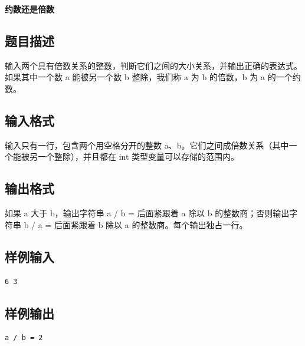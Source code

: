 \documentclass{article}
\newcommand{\problemname}[1]{\begin{center}\Large\bfseries #1\end{center}}
\begin{document}
\problemname{约数还是倍数}

\subsection*{题目描述}
输入两个具有倍数关系的整数，判断它们之间的大小关系，并输出正确的表达式。如果其中一个数 a 能被另一个数 b 整除，我们称 a 为 b 的倍数，b 为 a 的一个约数。

\subsection*{输入格式}
输入只有一行，包含两个用空格分开的整数 a、b。它们之间成倍数关系（其中一个能被另一个整除），并且都在 int 类型变量可以存储的范围内。

\subsection*{输出格式}
如果 a 大于 b，输出字符串 a / b = 后面紧跟着 a 除以 b 的整数商；否则输出字符串 b / a = 后面紧跟着 b 除以 a 的整数商。每个输出独占一行。

\subsection*{样例输入}
\begin{verbatim}
6 3
\end{verbatim}

\subsection*{样例输出}
\begin{verbatim}
a / b = 2
\end{verbatim}
\end{document}
